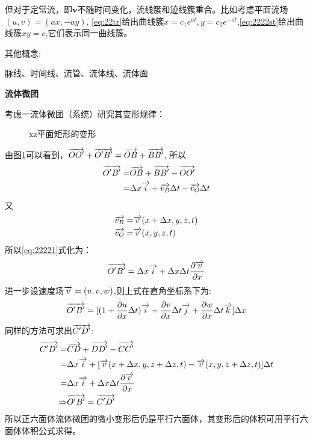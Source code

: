 但对于定常流，即$\bm{v}$不随时间变化，流线簇和迹线簇重合。比如考虑平面流场$(u,v)=(ax,-ay)$,
\eqref{eq:22tr}给出曲线簇$x=c_1e^{at},y=c_2e^{-at}$,\eqref{eq:2222st}给出曲线簇$xy=c$,它们表示同一曲线簇。

其他概念:

脉线、时间线、流管、流体线、流体面

\textbf{流体微团}


考虑一流体微团（系统）研究其变形规律：
\begin{figure}[!ht]
\def\svgwidth{8cm}
\centering

\caption{xz平面矩形的变形}\label{fig:221}
\end{figure}
由图\ref{fig:221}可以看到，$\overrightarrow{OO'}+\overrightarrow{O'B'}=\overrightarrow{OB}+\overrightarrow{BB'}$,
所以
\begin{align}\label{eq:22221}
\overrightarrow{O'B'}=&\overrightarrow{OB}+\overrightarrow{BB'}-\overrightarrow{OO'}\nonumber\\
=&\Delta x \overrightarrow{i}+\overrightarrow{v_B}\Delta t - \overrightarrow{v_O} \Delta t
\end{align}
又
\begin{align*}
\overrightarrow{v_B}=&\overrightarrow{v}(x+\Delta x,y,z,t)\\
\overrightarrow{v_O}=&\overrightarrow{v}(x,y,z,t)
\end{align*}
所以\eqref{eq:22221}式化为：
\begin{equation}
\overrightarrow{O'B'}=\Delta x \overrightarrow{i} + \Delta x\Delta t \frac{\partial \overrightarrow{v}}{\partial x}
\end{equation}
进一步设速度场$\overrightarrow{v}=(u,v,w)$,则上式在直角坐标系下为:
\begin{equation}\label{eq:222}
\overrightarrow{O'B'}=[(1+\frac{\partial u}{\partial x}\Delta t)\overrightarrow{i}+\frac{\partial v}{\partial x}\Delta t\overrightarrow{j}+\frac{\partial w}{\partial x}\Delta t\overrightarrow{k}]\Delta x
\end{equation}
同样的方法可求出$\overrightarrow{C'D'}$:
\begin{align*}
\overrightarrow{C'D'}=&\overrightarrow{CD}+\overrightarrow{DD'}-\overrightarrow{CC'}\\
=&\Delta x\overrightarrow{i}+[\overrightarrow{v}(x+\Delta x,y,z+\Delta z,t)-\overrightarrow{v}(x,y,z+\Delta z,t)]\Delta t\\
=&\Delta x \overrightarrow{i} +  \Delta x\Delta t \frac{\partial \overrightarrow{v}}{\partial x}\\
\Rightarrow & \overrightarrow{O'B'}=\overrightarrow{C'D'}
\end{align*}
所以正六面体流体微团的微小变形后仍是平行六面体，其变形后的体积可用平行六面体体积公式求得。

